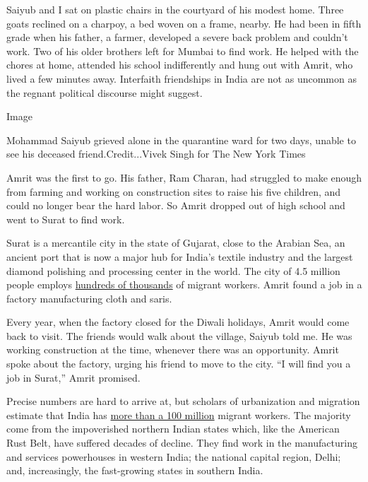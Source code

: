 Saiyub and I sat on plastic chairs in the courtyard of his modest home.
Three goats reclined on a charpoy, a bed woven on a frame, nearby. He
had been in fifth grade when his father, a farmer, developed a severe
back problem and couldn't work. Two of his older brothers left for
Mumbai to find work. He helped with the chores at home, attended his
school indifferently and hung out with Amrit, who lived a few minutes
away. Interfaith friendships in India are not as uncommon as the regnant
political discourse might suggest.

Image

Mohammad Saiyub grieved alone in the quarantine ward for two days,
unable to see his deceased friend.Credit...Vivek Singh for The New York
Times

Amrit was the first to go. His father, Ram Charan, had struggled to make
enough from farming and working on construction sites to raise his five
children, and could no longer bear the hard labor. So Amrit dropped out
of high school and went to Surat to find work.

Surat is a mercantile city in the state of Gujarat, close to the Arabian
Sea, an ancient port that is now a major hub for India's textile
industry and the largest diamond polishing and processing center in the
world. The city of 4.5 million people employs
\href{https://www.financialexpress.com/india-news/lakhs-of-migrant-workers-in-surat-desperate-to-return-to-their-native-states/1943533/}{hundreds
of thousands} of migrant workers. Amrit found a job in a factory
manufacturing cloth and saris.

Every year, when the factory closed for the Diwali holidays, Amrit would
come back to visit. The friends would walk about the village, Saiyub
told me. He was working construction at the time, whenever there was an
opportunity. Amrit spoke about the factory, urging his friend to move to
the city. ``I will find you a job in Surat,'' Amrit promised.

Precise numbers are hard to arrive at, but scholars of urbanization and
migration estimate that India has
\href{https://indianexpress.com/article/explained/coronavirus-india-lockdown-migran-workers-mass-exodus-6348834/}{more
than a 100 million} migrant workers. The majority come from the
impoverished northern Indian states which, like the American Rust Belt,
have suffered decades of decline. They find work in the manufacturing
and services powerhouses in western India; the national capital region,
Delhi; and, increasingly, the fast-growing states in southern India.

